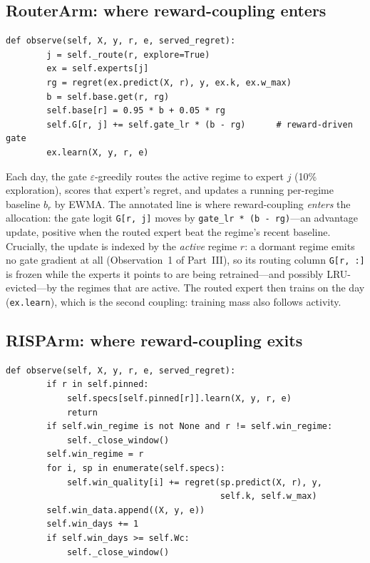 \subsection{RouterArm: where reward-coupling enters}
\label{sec:dd6-router}

\begin{lstlisting}[caption={\texttt{RouterArm.observe}: the reward-driven gate (\texttt{risp.py}).},label={lst:dd6-router}]
    def observe(self, X, y, r, e, served_regret):
        j = self._route(r, explore=True)
        ex = self.experts[j]
        rg = regret(ex.predict(X, r), y, ex.k, ex.w_max)
        b = self.base.get(r, rg)
        self.base[r] = 0.95 * b + 0.05 * rg
        self.G[r, j] += self.gate_lr * (b - rg)      # reward-driven gate
        ex.learn(X, y, r, e)
\end{lstlisting}

Each day, the gate $\varepsilon$-greedily routes the active regime to expert
$j$ (10\% exploration), scores that expert's regret, and updates a running
per-regime baseline $b_r$ by EWMA. The annotated line is where
reward-coupling \emph{enters} the allocation: the gate logit
\texttt{G[r, j]} moves by \texttt{gate\_lr * (b - rg)}---an advantage
update, positive when the routed expert beat the regime's recent baseline.
Crucially, the update is indexed by the \emph{active} regime $r$: a dormant
regime emits no gate gradient at all (Observation~1 of Part~III), so its
routing column \texttt{G[r, :]} is frozen while the experts it points to
are being retrained---and possibly LRU-evicted---by the regimes that are
active. The routed expert then trains on the day
(\texttt{ex.learn}), which is the second coupling: training mass also
follows activity.

\subsection{RISPArm: where reward-coupling exits}
\label{sec:dd6-risp}

\begin{lstlisting}[caption={\texttt{RISPArm.observe}: window accumulation and the pinning short-circuit (\texttt{risp.py}).},label={lst:dd6-nmobserve}]
    def observe(self, X, y, r, e, served_regret):
        if r in self.pinned:
            self.specs[self.pinned[r]].learn(X, y, r, e)
            return
        if self.win_regime is not None and r != self.win_regime:
            self._close_window()
        self.win_regime = r
        for i, sp in enumerate(self.specs):
            self.win_quality[i] += regret(sp.predict(X, r), y,
                                          self.k, self.w_max)
        self.win_data.append((X, y, e))
        self.win_days += 1
        if self.win_days >= self.Wc:
            self._close_window()
\end{lstlisting}

